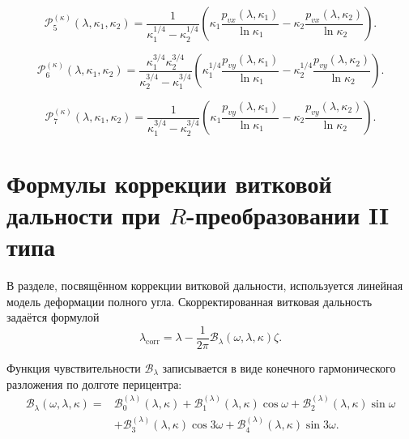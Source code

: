 \begin{equation}
	\mathcal P_5^{(\kappa)}(\lambda,\kappa_1,\kappa_2)=
	\frac{1}{\kappa_1^{1/4}-\kappa_2^{1/4}}
	\left(
	\kappa_1\frac{p_{vx}(\lambda,\kappa_1)}{\ln\kappa_1}-
	\kappa_2\frac{p_{vx}(\lambda,\kappa_2)}{\ln\kappa_2}
	\right).
	\label{eq:appendixC_P5_kappa}
\end{equation}

\begin{equation}
	\mathcal P_6^{(\kappa)}(\lambda,\kappa_1,\kappa_2)=
	\frac{\kappa_1^{3/4}\kappa_2^{3/4}}{\kappa_2^{3/4}-\kappa_1^{3/4}}
	\left(
	\kappa_1^{1/4}\frac{p_{vy}(\lambda,\kappa_1)}{\ln\kappa_1}-
	\kappa_2^{1/4}\frac{p_{vy}(\lambda,\kappa_2)}{\ln\kappa_2}
	\right).
	\label{eq:appendixC_P6_kappa}
\end{equation}

\begin{equation}
	\mathcal P_7^{(\kappa)}(\lambda,\kappa_1,\kappa_2)=
	\frac{1}{\kappa_1^{3/4}-\kappa_2^{3/4}}
	\left(
	\kappa_1\frac{p_{vy}(\lambda,\kappa_1)}{\ln\kappa_1}-
	\kappa_2\frac{p_{vy}(\lambda,\kappa_2)}{\ln\kappa_2}
	\right).
	\label{eq:appendixC_P7_kappa}
\end{equation}

\section*{Формулы коррекции витковой дальности при \(R\)-преобразовании II типа}

В разделе, посвящённом коррекции витковой дальности, используется линейная модель деформации полного угла. Скорректированная витковая дальность задаётся формулой
\begin{equation}
	\lambda_{\mathrm{corr}}
	=
	\lambda
	-
	\frac{1}{2\pi}
	\mathcal B_\lambda(\omega,\lambda,\kappa)\zeta.
	\label{eq:appendixC_lambda_correction}
\end{equation}

Функция чувствительности \(\mathcal B_\lambda\) записывается в виде конечного гармонического разложения по долготе перицентра:
\begin{equation}
	\begin{aligned}
		\mathcal B_\lambda(\omega,\lambda,\kappa)
		={}&
		\mathcal B_0^{(\lambda)}(\lambda,\kappa)
		+
		\mathcal B_1^{(\lambda)}(\lambda,\kappa)\cos\omega
		+
		\mathcal B_2^{(\lambda)}(\lambda,\kappa)\sin\omega
		\\
		&+
		\mathcal B_3^{(\lambda)}(\lambda,\kappa)\cos 3\omega
		+
		\mathcal B_4^{(\lambda)}(\lambda,\kappa)\sin 3\omega.
	\end{aligned}
	\label{eq:appendixC_B_lambda}
\end{equation}

